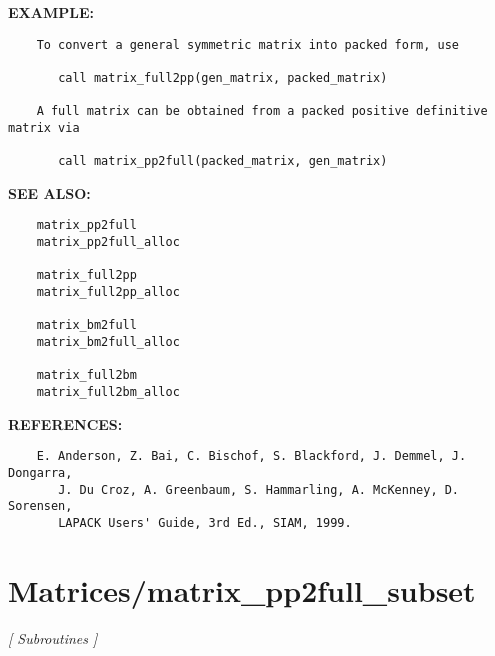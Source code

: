 \textbf{EXAMPLE:}\hspace{0.08in}\begin{Verbatim}
    To convert a general symmetric matrix into packed form, use

       call matrix_full2pp(gen_matrix, packed_matrix)

    A full matrix can be obtained from a packed positive definitive matrix via

       call matrix_pp2full(packed_matrix, gen_matrix)
\end{Verbatim}
\textbf{SEE ALSO:}\hspace{0.08in}\begin{Verbatim}
    matrix_pp2full
    matrix_pp2full_alloc

    matrix_full2pp
    matrix_full2pp_alloc

    matrix_bm2full
    matrix_bm2full_alloc

    matrix_full2bm
    matrix_full2bm_alloc
\end{Verbatim}
\textbf{REFERENCES:}\hspace{0.08in}\begin{Verbatim}
    E. Anderson, Z. Bai, C. Bischof, S. Blackford, J. Demmel, J. Dongarra,
       J. Du Croz, A. Greenbaum, S. Hammarling, A. McKenney, D. Sorensen,
       LAPACK Users' Guide, 3rd Ed., SIAM, 1999.
\end{Verbatim}
\section{Matrices/matrix\_pp2full\_subset}
\textsl{[ Subroutines ]}

